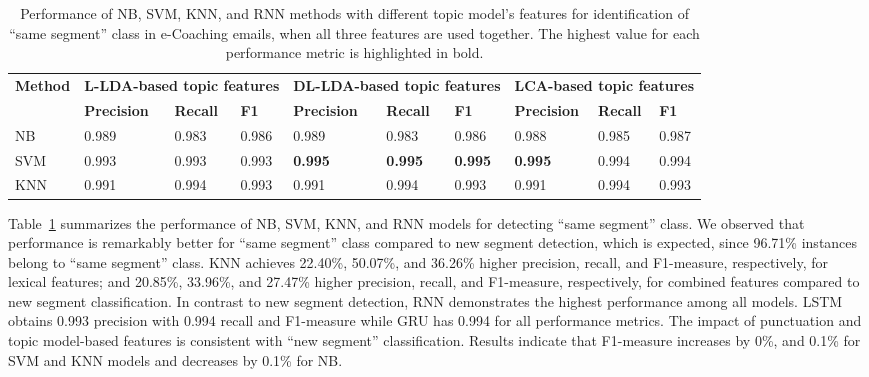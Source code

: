 \documentclass{amia}
\begin{document}
\begin{table}[ht]
\centering
\caption{Performance of NB, SVM, KNN, and RNN methods with different topic model's features for identification of ``same segment'' class in e-Coaching emails, when all three features are used together. The highest value for each performance metric is highlighted in bold.}
\label{tab:result_not_boundary}
  \begin{tabular}{|l|l|l|l|l|l|l|l|l|l|}
  \hline
   \multirow{2}{*}{\textbf{Method}} & \multicolumn{3}{|c|}{\textbf{L-LDA-based topic features}} & \multicolumn{3}{|c|}{\textbf{DL-LDA-based topic features}}  & \multicolumn{3}{|c|}{\textbf{LCA-based topic features}} \\\cline{2-10} & \textbf{Precision}  & \textbf{Recall} & \textbf{F1} & \textbf{Precision}  & \textbf{Recall} & \textbf{F1} & \textbf{Precision}  & \textbf{Recall} & \textbf{F1}\\ \hline  
    
 NB & 0.989 & 0.983 & 0.986 & 0.989 & 0.983 & 0.986 & 0.988 & 0.985 & 0.987 \\ \hline
 SVM & 0.993 & 0.993 & 0.993 & \textbf{0.995} & \textbf{0.995} & \textbf{0.995} & \textbf{0.995} & 0.994 & 0.994  \\ \hline
 KNN & 0.991 & 0.994 & 0.993 & 0.991 & 0.994 & 0.993 & 0.991 & 0.994 & 0.993 \\ \hline
  \end{tabular}
\end{table}         

Table~\ref{tab:result_not_boundary} summarizes the performance of NB, SVM, KNN, and RNN models for detecting ``same segment'' class. We observed that performance is remarkably better for ``same segment'' class compared to new segment detection, which is expected, since 96.71\% instances belong to ``same segment'' class. KNN achieves 22.40\%, 50.07\%, and 36.26\% higher precision, recall, and F1-measure, respectively, for lexical features; and 20.85\%, 33.96\%, and 27.47\% higher precision, recall, and F1-measure, respectively, for combined features compared to new segment classification. In contrast to new segment detection, RNN demonstrates the highest performance among all models. LSTM obtains 0.993 precision with 0.994 recall and F1-measure while GRU has 0.994 for all performance metrics. The impact of punctuation and topic model-based features is consistent with ``new segment'' classification. Results indicate that F1-measure increases by 0\%, and 0.1\% for SVM and KNN models and decreases by 0.1\% for NB. \\
\end{document}
